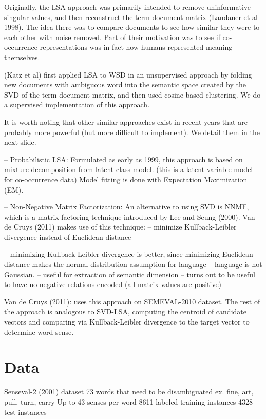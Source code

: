\documentclass[10pt, letterpaper]{article}
\begin{document}
	Originally, the LSA approach was primarily intended to remove uninformative singular values, and then reconstruct the term-document matrix (Landauer et al 1998).  The idea there was to compare documents to see how similar they were to each other with noise removed. Part of their motivation was to see if co-occurrence representations was in fact how humans represented meaning themselves.

	(Katz et al) first applied LSA to WSD in an unsupervised approach by folding new documents with ambiguous word into the semantic space created by the SVD of the term-document matrix, and then used cosine-based clustering. We do a supervised implementation of this approach. 

	It is worth noting that other similar approaches exist in recent years that are probably more powerful (but more difficult to implement). We detail them in the next slide. 

	-- Probabilistic LSA: Formulated as early as 1999, this approach is based on mixture decomposition from latent class model. 
	(this is a latent variable model for co-occurrence data)
	Model fitting is done with Expectation Maximization (EM).

	-- Non-Negative Matrix Factorization: An alternative to using SVD is NNMF, which is a matrix factoring technique introduced by Lee and Seung  (2000).  Van de Cruys (2011) makes use of this technique:
	-- minimize Kullback-Leibler divergence instead of Euclidean distance

	-- minimizing Kullback-Leibler divergence is better, since minimizing Euclidean distance makes the normal distribution assumption for language -- language is not Gaussian.
	-- useful for extraction of semantic dimension 
	-- turns out to be useful to have no negative relations encoded (all matrix values are positive)

	Van de Cruys (2011): uses this approach on SEMEVAL-2010 dataset. The rest of the approach is analogous to SVD-LSA, computing the centroid  of candidate vectors and comparing via Kullback-Leibler divergence to the target vector to determine word sense. 

	\section{Data}
	Senseval-2 (2001) dataset
	73 words that need to be disambiguated
	         ex. fine, art, pull, turn, carry
	Up to 43 senses per word
	8611 labeled training instances
	4328 test instances	
\end{document}
